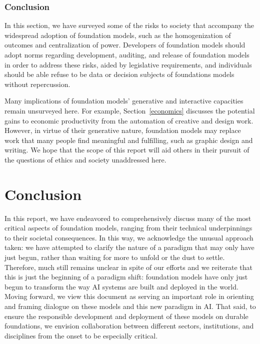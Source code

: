 \subsubsection{Conclusion} In this section, we have surveyed some of the risks to society that accompany the widespread adoption of foundation models, such as the homogenization of outcomes and centralization of power. Developers of foundation models should adopt norms regarding development, auditing, and release of foundation models in order to address these risks, aided by legislative requirements, and individuals should be able refuse to be data or decision subjects of foundations models without repercussion.

Many implications of foundation models' generative and interactive capacities remain unsurveyed here. For example, Section~\ref{economics} discusses the potential gains to economic productivity from the automation of creative and design work. However, in virtue of their generative nature, foundation models may replace work that many people find meaningful and fulfilling, such as graphic design and writing. We hope that the scope of this report will aid others in their pursuit of the questions of ethics and society unaddressed here. 

\section{Conclusion}
\label{sec:conclusion}
In this report, we have endeavored to comprehensively discuss many of the most critical aspects of foundation models, ranging from their technical underpinnings to their societal consequences. In this way, we acknowledge the unusual approach taken: we have attempted to clarify the nature of a paradigm that may only have just begun, rather than waiting for more to unfold or the dust to settle. Therefore, much still remains unclear in spite of our efforts and we reiterate that this is just the beginning of a paradigm shift: foundation models have only just begun to transform the way AI systems are built and deployed in the world. Moving forward, we view this document as serving an important role in orienting and framing dialogue on these models and this new paradigm in AI. That said, to ensure the responsible development and deployment of these models on durable foundations, we envision collaboration between different sectors, institutions, and disciplines from the onset to be especially critical.

